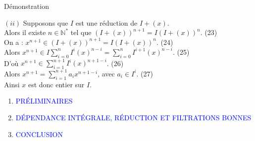 \documentclass[11pt,a4paper]{beamer}
\begin{document}
	
					\begin{frame}{Démonstration}
		\begin{block}{}
				$(ii)$ Supposons que $I$ est une réduction de $I + (x)$.\\
			Alors il existe $ n \in \mathbb{N^*}$ tel que $(I + (x))^{n+1} = I(I + (x))^{n}$. (23)\\
			On a : $x^{n+1} \in (I + (x))^{n+1} = I(I + (x))^{n}$. (24)\\Alors $x^{n+1} \in I\displaystyle \sum_{i=0}^{n}{I^i (x)^{n-i}} = \displaystyle \sum_{i=0}^{n}{I^{i+1} (x)^{n-i}}$. (25)\\
			D'où $x^{n+1} \in \displaystyle \sum_{i=1}^{n+1}{I^i (x)^{n+1-i}}$. (26)\\ Alors $ x^{n+1} =  \displaystyle \sum_{i=1}^{n+1}{a_i x^{n+1-i}}$, avec $a_i \in I^i$. (27)\\ Ainsi $x$ est donc entier sur $I$.
		\end{block}
	\end{frame}
	
	
	
	
	\begin{frame}
		\begin{enumerate}
			\item<0> \textcolor{blue}{PRÉLIMINAIRES}\\
			\item<1> \textcolor{blue}{DÉPENDANCE INTÉGRALE, RÉDUCTION ET FILTRATIONS BONNES }\\
			\item<0> \textcolor{blue}{CONCLUSION}\\
		\end{enumerate}
	\end{frame}
	
\end{document}
